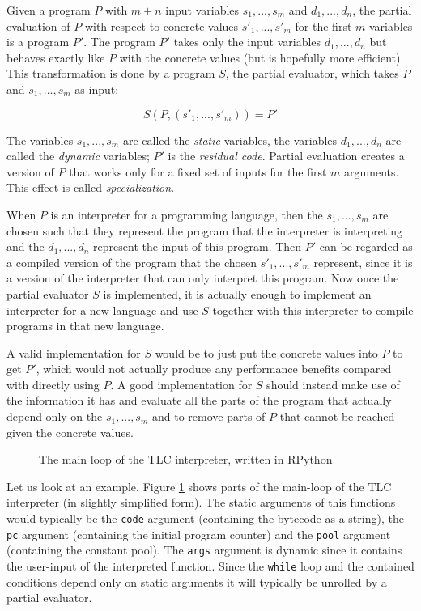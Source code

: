 Given a program $P$ with $m + n$ input variables $s_1, ..., s_m$ and $d_1, ...,
d_n$, the partial evaluation of $P$ with respect to concrete values $s'_1, ...,
s'_m$ for the first $m$ variables is a program $P'$. The program $P'$ takes only
the input variables $d_1, ..., d_n$ but behaves exactly like $P$ with the
concrete values (but is hopefully more efficient). This transformation is done
by a program $S$, the partial evaluator, which takes $P$ and $s_1, ..., s_m$ as
input:

    $$S(P, (s'_1, ..., s'_m)) = P'$$

The variables $s_1, ..., s_m$ are called the \emph{static} variables, the
variables $d_1, ..., d_n$ are called the \emph{dynamic} variables; $P'$ is the
\emph{residual code}. Partial evaluation creates a version of $P$ that works
only for a fixed set of inputs for the first $m$ arguments. This effect is
called \emph{specialization}.

When $P$ is an interpreter for a programming language, then the $s_1, ..., s_m$
are chosen such that they represent the program that the interpreter is
interpreting and the $d_1, ..., d_n$ represent the input of this program. Then
$P'$ can be regarded as a compiled version of the program that the chosen $s'_1,
..., s'_m$ represent, since it is a version of the interpreter that can only
interpret this program. Now once the partial evaluator $S$ is implemented, it is
actually enough to implement an interpreter for a new language and use $S$
together with this interpreter to compile programs in that new language.

A valid implementation for $S$ would be to just put the concrete values into $P$
to get $P'$, which would not actually produce any performance benefits compared with
directly using $P$. A good implementation for $S$ should instead make use of the
information it has and evaluate all the parts of the program that actually
depend only on the $s_1, ..., s_m$ and to remove parts of $P$ that cannot be
reached given the concrete values.

\begin{figure}[h]
\begin{center}

\caption{The main loop of the TLC interpreter, written in RPython}
\label{fig:tlc-main}
\end{center}
\end{figure}

Let us look at an example. Figure \ref{fig:tlc-main} shows parts of the
main-loop of the TLC interpreter (in slightly simplified form). The static
arguments of this functions would typically be the \lstinline{code} argument
(containing the bytecode as a string), the \lstinline{pc} argument (containing
the initial program counter) and the \lstinline{pool} argument (containing the
constant pool). The \lstinline{args} argument is dynamic since it contains the
user-input of the interpreted function. Since the \lstinline{while} loop and the
contained conditions depend only on static arguments it will typically be
unrolled by a partial evaluator.

